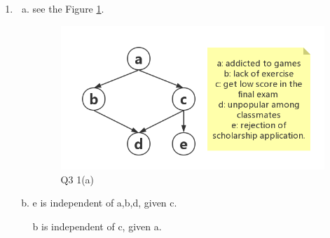 \documentclass[a4paper, 11pt]{article}
\begin{document}
\begin{enumerate}
  \item
    \begin{enumerate}[(a)]
      \item see the Figure \ref{Q3fig1}.
      \begin{figure}[htbp]
        \centering
        \includegraphics[width=15cm]{pic/1}
        \caption{Q3 1(a)}
        \label{Q3fig1}
      \end{figure}
      \item
      e is independent of a,b,d, given c.

      b is independent of c, given a.


\end{enumerate}
\end{enumerate}
\end{document}
